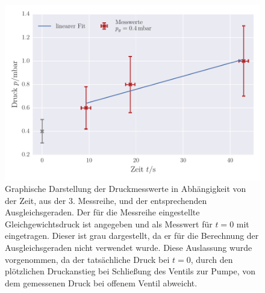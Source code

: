 \begin{figure}[!h]
 \centering
 \includegraphics[scale=0.65]{../Grafiken/Leckrate_Drehschieber_2.pdf}
 \caption{Graphische Darstellung der Druckmesswerte in Abhängigkeit von der Zeit, aus der 3. Messreihe, und der
 	entsprechenden Ausgleichsgeraden. Der für die Messreihe eingestellte Gleichgewichtsdruck ist angegeben und als Messwert für $t=0$ mit eingetragen. Dieser ist grau dargestellt, da er für die 
 	Berechnung der Ausgleichsgeraden nicht verwendet wurde. Diese Auslassung wurde vorgenommen, da
 	der tatsächliche Druck bei $t=0$, durch den plötzlichen Druckanstieg bei Schließung des Ventils zur Pumpe, von dem
 	gemessenen Druck bei offenem Ventil abweicht.  \label{fig:leckrate_drehschieber_2}}
 \end{figure} 